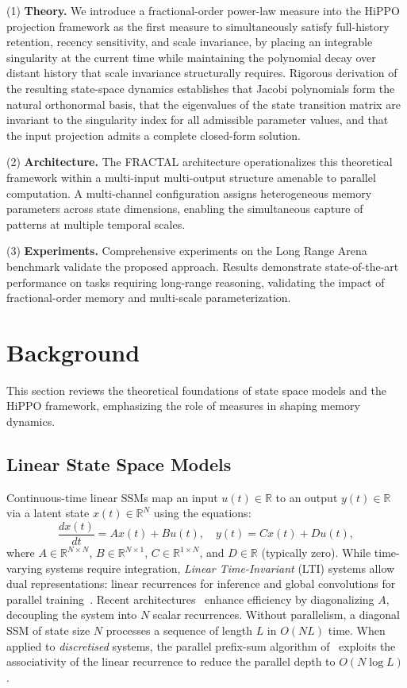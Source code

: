 \documentclass{article}
\theoremstyle{plain}
\theoremstyle{definition}
\theoremstyle{remark}
\begin{document}
(1) \textbf{Theory.} We introduce a fractional-order power-law measure into the HiPPO projection framework as the first measure to simultaneously satisfy full-history retention, recency sensitivity, and scale invariance, by placing an integrable singularity at the current time while maintaining the polynomial decay over distant history that scale invariance structurally requires. Rigorous derivation of the resulting state-space dynamics establishes that Jacobi polynomials form the natural orthonormal basis, that the eigenvalues of the state transition matrix are invariant to the singularity index for all admissible parameter values, and that the input projection admits a complete closed-form solution.

(2) \textbf{Architecture.} The FRACTAL architecture operationalizes this theoretical framework within a multi-input multi-output structure amenable to parallel computation. A multi-channel configuration assigns heterogeneous memory parameters across state dimensions, enabling the simultaneous capture of patterns at multiple temporal scales.

(3) \textbf{Experiments.} Comprehensive experiments on the Long Range Arena benchmark validate the proposed approach. Results demonstrate state-of-the-art performance on tasks requiring long-range reasoning, validating the impact of fractional-order memory and multi-scale parameterization.
\section{Background}
\label{sec:background}

This section reviews the theoretical foundations of state space models and the HiPPO framework, emphasizing the role of measures in shaping memory dynamics.

\subsection{Linear State Space Models}
\label{subsec:ssm}

Continuous-time linear SSMs map an input $u(t) \in \mathbb{R}$ to an output $y(t) \in \mathbb{R}$ via a latent state $x(t) \in \mathbb{R}^N$ using the equations:
\begin{equation}
	\frac{dx(t)}{dt} = Ax(t) + Bu(t), \quad y(t) = Cx(t) + Du(t),
	\label{eq:ssm_continuous}
\end{equation}
where $A \in \mathbb{R}^{N \times N}$, $B \in \mathbb{R}^{N \times 1}$, $C \in \mathbb{R}^{1 \times N}$, and $D \in \mathbb{R}$ (typically zero). 
While time-varying systems require integration, \textit{Linear Time-Invariant} (LTI) systems allow dual representations: linear recurrences for inference and global convolutions for parallel training~\citep{gu2022efficiently}. Recent architectures~\citep{gupta2022diagonal, smith2023simplified} enhance efficiency by diagonalizing $A$, decoupling the system into $N$ scalar recurrences. Without parallelism, a diagonal SSM of state size $N$ processes a sequence of length $L$ in $O(NL)$ time. When applied to \emph{discretised} systems, the parallel prefix-sum algorithm of~\citet{blelloch1990prefix} exploits the associativity of the linear recurrence to reduce the parallel depth to $O(N \log L)$.
\end{document}
